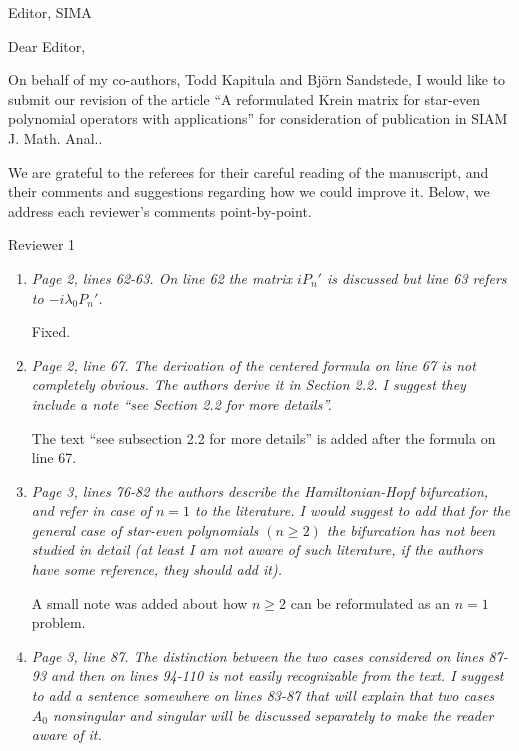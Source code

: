 \documentclass[11pt]{letter}
\begin{document}
\address{Ross Parker \\
Division of Applied Mathematics \\
Brown University \\
Providence, RI 02912 \\
\texttt{ross\_parker@brown.edu}}%
\signature{Ross Parker}
\begin{letter}{Editor, SIMA}

\opening{Dear Editor,}

On behalf of my co-authors, Todd Kapitula and Bj\"orn Sandstede, I would like to submit our revision of the article ``A reformulated Krein matrix for star-even polynomial operators with applications'' for consideration of publication in SIAM J. Math. Anal..

We are grateful to the referees for their careful reading of the manuscript, and their comments and suggestions regarding how we could improve it. Below, we address each reviewer's comments point-by-point.

Reviewer 1
\begin{enumerate}

\item \emph{Page 2, lines 62-63. On line 62 the matrix $iP_n'$ is discussed but line 63 refers to $-i\lambda_0 P_n'$.}
\vspace{4mm}

Fixed.

\item \emph{Page 2, line 67. The derivation of the centered formula on line 67 is not completely obvious. The authors derive it in Section 2.2. I suggest they include a note ``see Section 2.2 for more details''.}
\vspace{4mm}

The text ``see subsection 2.2 for more details'' is added after the formula on line 67.

\item \emph{Page 3, lines 76-82 the authors describe the Hamiltonian-Hopf bifurcation, and refer in case of $n = 1$ to the literature. I would suggest to add that for the general case of star-even polynomials $(n \geq 2)$ the bifurcation has not been studied in detail (at least I am not aware of such literature, if the authors have some reference, they should add it).}
\vspace{4mm}

A small note was added about how $n\ge2$ can be reformulated as an $n=1$ problem.

\item \emph{Page 3, line 87. The distinction between the two cases considered on lines 87-93 and then on lines 94-110 is not easily recognizable from the text. I suggest to add a sentence somewhere on lines 83-87 that will explain that two cases $A_0$ nonsingular and singular will be discussed separately to make the reader aware of it.}
\vspace{4mm}


\end{enumerate}
\end{letter}
\end{document}
